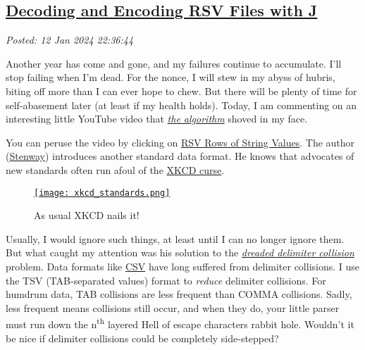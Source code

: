 %

\subsection*{\href{http://analyzethedatanotthedrivel.org/2024/01/12/decoding-and-encoding-rsv-files-with-j/}{Decoding and Encoding RSV Files with J}}


\noindent\emph{Posted: 12 Jan 2024 22:36:44}
\vspace{6pt}

Another year has come and gone, and my failures continue to accumulate.
I'll stop failing when I'm dead. For the nonce, I will stew in my abyss
of hubris, biting off more than I can ever hope to chew. But there will
be plenty of time for self-abasement later (at least if my health
holds). Today, I am commenting on an interesting little YouTube video
that
\href{https://www.technologyreview.com/2022/09/20/1059709/youtube-algorithm-recommendations/}{\emph{the
algorithm}} shoved in my face.

You can peruse the video by clicking on
\href{https://www.youtube.com/watch?v=tb_70o6ohMA}{RSV Rows of String
Values}. The author (\href{https://github.com/Stenway}{Stenway})
introduces another standard data format. He knows that advocates of new
standards often run afoul of the \href{https://xkcd.com/927/}{XKCD
curse}.

 \captionsetup[figure]{labelformat=empty}
\begin{figure}[htbp]
\centering
 \href{https://xkcd.com/927/}{\texttt{[image: xkcd\_standards.png]}}
 \caption{As usual XKCD nails it!}
 \label{fig:7962x0}
\end{figure}

Usually, I would ignore such things, at least until I can no longer
ignore them. But what caught my attention was his solution to the
\emph{\href{https://en.wikipedia.org/wiki/Delimiter}{dreaded delimiter
collision}} problem. Data formats like
\href{https://en.wikipedia.org/wiki/Comma-separated_values}{CSV} have
long suffered from delimiter collisions. I use the TSV (TAB-separated
values) format to \emph{reduce} delimiter collisions. For humdrum data,
TAB collisions are less frequent than COMMA collisions. Sadly, less
frequent means collisions still occur, and when they do, your little
parser must run down the n\textsuperscript{th} layered Hell of escape
characters rabbit hole. Wouldn't it be nice if delimiter collisions
could be completely side-stepped?

